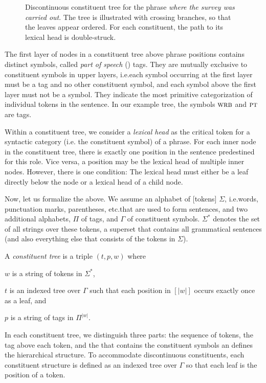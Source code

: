 \documentclass[../document.tex]{subfiles}
\begin{document}
    \begin{figure}
        \null\hfill
        
        \hfill\null

        \caption{\label{fig:pre:ctree}
            Discontinuous constituent tree for the phrase \emph{where the survey was carried out}.
            The tree is illustrated with crossing branches, so that the leaves appear ordered.
            For each constituent, the path to its lexical head is double-struck.
        }
    \end{figure}

    The first layer of nodes in a constituent tree above phrase positions contains distinct symbols, called \emph{part of speech} () tags.
    They are mutually exclusive to constituent symbols in upper layers, i.e.\@ each symbol occurring at the first layer must be a  tag and no other constituent symbol, and each symbol above the first layer must not be a  symbol.
    They indicate the most primitive categorization of individual tokens in the sentence.
    In our example tree, the symbols \(\textsc{wrb}\) and \(\textsc{pt}\) are  tags.

    Within a constituent tree, we consider a \emph{lexical head} as the critical token for a syntactic category (i.e. the constituent symbol) of a phrase.
    For each inner node in the constituent tree, there is exactly one position in the sentence predestined for this role.
    Vice versa, a position may be the lexical head of multiple inner nodes.
    However, there is one condition: The lexical head must either be a leaf directly below the node or a lexical head of a child node.

    Now, let us formalize the above.
    We assume an alphabet of [tokens] \(\Sigma\), i.e.\@ words, punctuation marks, parentheses, etc.\@ that are used to form sentences, and two additional alphabets, \(\varPi\) of  tags, and \(\varGamma\) of constituent symbols.
    \(\Sigma^*\) denotes the set of all strings over these tokens, a superset that contains all grammatical sentences (and also everything else that consists of the tokens in \(\Sigma\)).

    A \emph{constituent tree} is a triple \((t, p, w)\) where
    \begin{compactitem}
        \item \(w\) is a string of tokens in \(\varSigma^*\),
        \item \(t\) is an indexed tree over \(\varGamma\) such that each position in \([|w|]\) occurs exactly once as a leaf, and
        \item \(p\) is a string of  tags in \(\varPi^{|w|}\).
    \end{compactitem}
    In each constituent tree, we distinguish three parts: the sequence of tokens, the  tag above each token, and the  that contains the constituent symbols an defines the hierarchical structure.
    To accommodate discontinuous constituents, each constituent structure is defined as an indexed tree over \(\varGamma\) so that each leaf is the position of a token.
\end{document}
